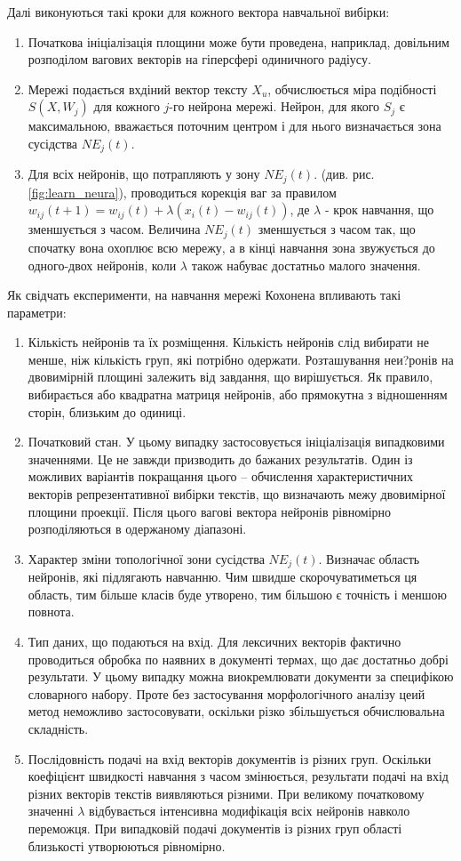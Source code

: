 Далі виконуються такі кроки для кожного вектора навчальної вибірки:
\begin{enumerate}
	\item Початкова ініціалізація площини може бути проведена, наприклад, довільним розподілом вагових векторів на гіперсфері одиничного радіусу. 
	\item Мережі подається вхдіний вектор тексту $X_{u}$, обчислюється міра подібності $S(X, W_{j})$ для кожного $j$-го нейрона мережі. Нейрон, для якого $S_{j}$ є максимальною, вважається поточним центром і для нього визначається зона сусідства $NE_{j}(t)$.
	\item Для всіх нейронів, що потрапляють у зону $NE_{j}(t)$. (див. рис. \ref{fig:learn_neura}), проводиться корекція ваг за правилом $w_{ij}(t+1) = w_{ij}(t) + \lambda(x_{i}(t) - w_{ij}(t))$, де $\lambda$ - крок навчання, що зменшується з часом. Величина $NE_{j}(t)$ зменшується з часом так, що спочатку вона охоплює всю мережу, а в кінці навчання зона звужується до одного-двох нейронів, коли $\lambda$ також набуває достатньо малого значення.
\end{enumerate}

Як свідчать експерименти, на навчання мережі Кохонена впливають такі параметри:
\begin{enumerate}
	\item Кількість нейронів та їх розміщення. Кількість нейронів слід вибирати не менше, ніж кількість груп, які потрібно одержати. Розташування неи?ронів на двовимірній площині залежить від завдання, що вирішується. Як правило, вибирається або квадратна матриця нейронів, або прямокутна з відношенням сторін, близьким до одиниці.
	\item Початковий стан. У цьому випадку застосовується ініціалізація випадковими значеннями. Це не завжди призводить до бажаних результатів. Один із можливих варіантів покращання цього – обчислення характеристичних векторів репрезентативної вибірки текстів, що визначають межу двовимірної площини проекції. Після цього вагові вектора нейронів рівномірно розподіляються в одержаному діапазоні.
	\item Характер зміни топологічної зони сусідства $NE_{j}(t)$. Визначає область нейронів, які підлягають навчанню. Чим швидше скорочуватиметься ця область, тим більше класів буде утворено, тим більшою є точність і меншою повнота.
	\item Тип даних, що подаються на вхід. Для лексичних векторів фактично проводиться обробка по наявних в документі термах, що дає достатньо добрі результати. У цьому випадку можна виокремлювати документи за специфікою словарного набору. Проте без застосування морфологічного аналізу цеий метод неможливо застосовувати, оскільки різко збільшується обчислювальна складність.
	\item Послідовність подачі на вхід векторів документів із різних груп. Оскільки коефіцієнт швидкості навчання з часом змінюється, результати подачі на вхід різних векторів текстів виявляються різними. При великому початковому значенні $\lambda$ відбувається інтенсивна модифікація всіх нейронів навколо переможця. При випадковій подачі документів із різних груп області близькості утворюються рівномірно.
\end{enumerate}

